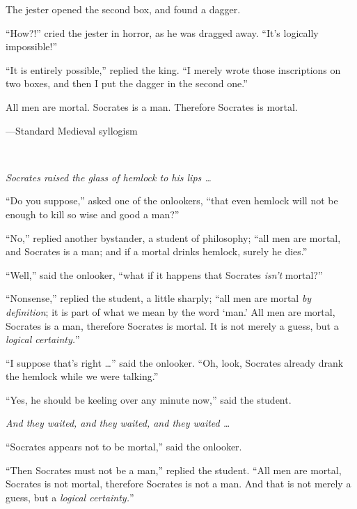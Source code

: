 {
 The jester opened the second box, and found a dagger.}

{
 ``How?!'' cried the jester in
horror, as he was dragged away. ``It's
logically impossible!''}

{
 ``It is entirely possible,''
replied the king. ``I merely wrote those inscriptions
on two boxes, and then I put the dagger in the second
one.''}

\myendsectiontext


\bigskip


{
 All men are mortal. Socrates is a man. Therefore Socrates is
mortal.}

{\raggedleft
 {}---Standard Medieval syllogism
\par}


\bigskip

{
 ~}

{
 \textit{Socrates raised the glass of hemlock to his lips \ldots}}

{
 ``Do you suppose,'' asked one
of the onlookers, ``that even hemlock will not be
enough to kill so wise and good a man?''}

{
 ``No,'' replied another
bystander, a student of philosophy; ``all men are
mortal, and Socrates is a man; and if a mortal drinks hemlock, surely
he dies.''}

{
 ``Well,'' said the onlooker,
``what if it happens that Socrates
\textit{isn't} mortal?''}

{
 ``Nonsense,'' replied the
student, a little sharply; ``all men are mortal
\textit{by definition}; it is part of what we mean by the word
`man.' All men are mortal, Socrates is a
man, therefore Socrates is mortal. It is not merely a guess, but a
\textit{logical certainty.}''}

{
 ``I suppose that's right
\ldots'' said the onlooker. ``Oh,
look, Socrates already drank the hemlock while we were
talking.''}

{
 ``Yes, he should be keeling over any minute
now,'' said the student.}

{
 \textit{And they waited, and they waited, and they waited \ldots}}

{
 ``Socrates appears not to be
mortal,'' said the onlooker.}

{
 ``Then Socrates must not be a
man,'' replied the student. ``All
men are mortal, Socrates is not mortal, therefore Socrates is not a
man. And that is not merely a guess, but a \textit{logical
certainty.}''}

